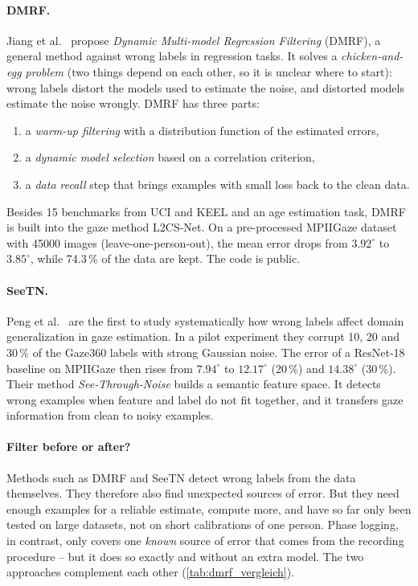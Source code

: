 \paragraph{DMRF.}
Jiang et al.~\cite{jiang2026dmrf} propose \emph{Dynamic Multi-model Regression
Filtering} (DMRF), a general method against wrong labels in regression tasks.
It solves a \emph{chicken-and-egg problem} (two things depend on each other,
so it is unclear where to start): wrong labels distort the models used to
estimate the noise, and distorted models estimate the noise wrongly. DMRF has
three parts:
\begin{enumerate}
  \item a \emph{warm-up filtering} with a distribution function of the
        estimated errors,
  \item a \emph{dynamic model selection} based on a correlation criterion,
  \item a \emph{data recall} step that brings examples with small loss back to
        the clean data.
\end{enumerate}
Besides 15 benchmarks from UCI and KEEL and an age estimation task, DMRF is
built into the gaze method L2CS-Net. On a pre-processed MPIIGaze dataset with
\num{45000} images (leave-one-person-out), the mean error drops from
$3.92^\circ$ to $3.85^\circ$, while 74.3\,\% of the data are kept. The code is
public.

\paragraph{SeeTN.}
Peng et al.~\cite{peng2026seetn} are the first to study systematically how
wrong labels affect domain generalization in gaze estimation. In a pilot
experiment they corrupt 10, 20 and 30\,\% of the Gaze360 labels with strong
Gaussian noise. The error of a ResNet-18 baseline on MPIIGaze then rises from
$7.94^\circ$ to $12.17^\circ$ (20\,\%) and $14.38^\circ$ (30\,\%). Their method
\emph{See-Through-Noise} builds a semantic feature space. It detects wrong
examples when feature and label do not fit together, and it transfers gaze
information from clean to noisy examples.

\paragraph{Filter before or after?}
Methods such as DMRF and SeeTN detect wrong labels from the data themselves.
They therefore also find unexpected sources of error. But they need enough
examples for a reliable estimate, compute more, and have so far only been tested
on large datasets, not on short calibrations of one person. Phase logging, in
contrast, only covers one \emph{known} source of error that comes from the
recording procedure -- but it does so exactly and without an extra model. The
two approaches complement each other (\cref{tab:dmrf_vergleich}).

